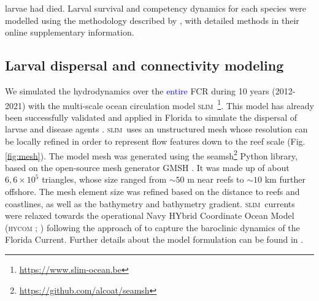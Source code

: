 \documentclass[preprint,12pt,authoryear]{elsarticle}
\newcommand{\modif}[1]{\textcolor{blue}{#1}}
\newcommand{\hycom}{\textsc{hycom} }
\newcommand{\slim}{\textsc{slim}\ }
\begin{document}
larvae had died. Larval survival and competency dynamics for each species were modelled using the methodology described by \cite{figueiredo2022global}, with detailed methods in their online supplementary information.
	
	\subsection*{Larval dispersal and connectivity modeling}
	
	We simulated the hydrodynamics over the \modif{entire} FCR during 10 years (2012-2021) with the multi-scale ocean circulation model \slim\footnote{\href{ https://www.slim-ocean.be}{https://www.slim-ocean.be}}. This model has already been successfully validated and applied in Florida to simulate the dispersal of larvae and disease agents \citep{frys2020fine,dobbelaere2020coupled,dobbelaere2022connecting,king2023larval}. \slim uses an unstructured mesh whose resolution can be locally refined in order to represent flow features down to the reef scale (Fig. \ref{fig:mesh}). The model mesh was generated using the seamsh\footnote{\href{https://github.com/alcoat/seamsh}{https://github.com/alcoat/seamsh}} Python library, based on the open-source mesh generator GMSH \citep{geuzaine2009gmsh}. It was made up of about $6,6\times 10^5$ triangles, whose size ranged from $\sim 50$ m near reefs to $\sim 10$ km further offshore. The mesh element size was refined based on the distance to reefs and coastlines, as well as the bathymetry and bathymetry gradient. \slim currents were relaxed towards the operational Navy HYbrid Coordinate Ocean Model (\hycom; \citealp{chassignet2007hycom}) following the approach of \citep{dobbelaere2022impacts} to capture the baroclinic dynamics of the Florida Current. Further details about the model formulation can be found in \citep{frys2020fine}.
	
\end{document}

